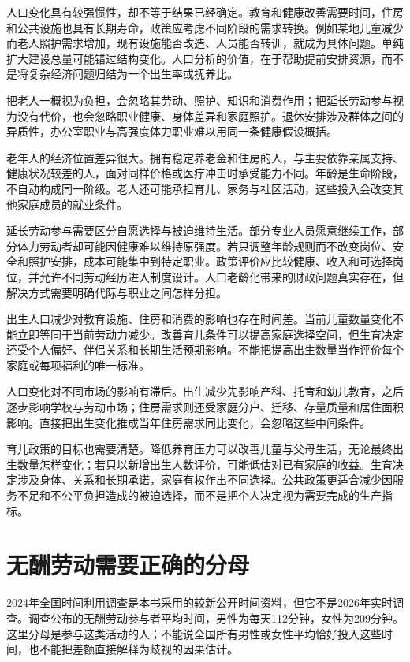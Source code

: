 \documentclass[UTF8,fontset=fandol,zihao=-4,oneside,openany]{ctexbook}
\begin{document}
人口变化具有较强惯性，却不等于结果已经确定。教育和健康改善需要时间，住房和公共设施也具有长期寿命，政策应考虑不同阶段的需求转换。例如某地儿童减少而老人照护需求增加，现有设施能否改造、人员能否转训，就成为具体问题。单纯扩大建设总量可能错过结构变化。人口分析的价值，在于帮助提前安排资源，而不是将复杂经济问题归结为一个出生率或抚养比。

把老人一概视为负担，会忽略其劳动、照护、知识和消费作用；把延长劳动参与视为没有代价，也会忽略职业健康、身体差异和家庭照护。退休安排涉及群体之间的异质性，办公室职业与高强度体力职业难以用同一条健康假设概括。

\label{arg:P142}
老年人的经济位置差异很大。拥有稳定养老金和住房的人，与主要依靠亲属支持、健康状况较差的人，面对同样价格或医疗冲击时承受能力不同。年龄是生命阶段，不自动构成同一阶级。老人还可能承担育儿、家务与社区活动，这些投入会改变其他家庭成员的就业条件。

延长劳动参与需要区分自愿选择与被迫维持生活。部分专业人员愿意继续工作，部分体力劳动者却可能因健康难以维持原强度。若只调整年龄规则而不改变岗位、安全和照护安排，成本可能集中到特定职业。政策评价应比较健康、收入和可选择岗位，并允许不同劳动经历进入制度设计。人口老龄化带来的财政问题真实存在，但解决方式需要明确代际与职业之间怎样分担。

出生人口减少对教育设施、住房和消费的影响也存在时间差。当前儿童数量变化不能立即等同于当前劳动力减少。改善育儿条件可以提高家庭选择空间，但生育决定还受个人偏好、伴侣关系和长期生活预期影响。不能把提高出生数量当作评价每个家庭或每项福利的唯一标准。

\label{arg:P143}
人口变化对不同市场的影响有滞后。出生减少先影响产科、托育和幼儿教育，之后逐步影响学校与劳动市场；住房需求则还受家庭分户、迁移、存量质量和居住面积影响。直接把出生变化推成当年住房需求同比变化，会忽略这些中间条件。

育儿政策的目标也需要清楚。降低养育压力可以改善儿童与父母生活，无论最终出生数量怎样变化；若只以新增出生人数评价，可能低估对已有家庭的收益。生育决定涉及身体、关系和长期承诺，家庭有权作出不同选择。公共政策更适合减少因服务不足和不公平负担造成的被迫选择，而不是把个人决定视为需要完成的生产指标。

\section{无酬劳动需要正确的分母}
2024年全国时间利用调查是本书采用的较新公开时间资料，但它不是2026年实时调查。调查公布的无酬劳动参与者平均时间，男性为每天112分钟，女性为209分钟。这里分母是参与这类活动的人；不能说全国所有男性或女性平均恰好投入这些时间，也不能把差额直接解释为歧视的因果估计。\cite{TimeUse2024}
\end{document}
